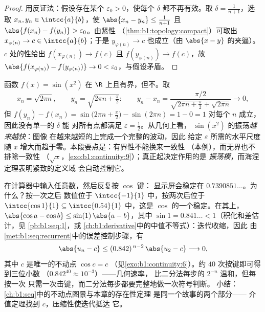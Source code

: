 \begin{proof}
用反证法：假设存在某个 $\varepsilon_0 > 0$，使每个
$\delta$ 都不再有效。取 $\delta = \frac{1}{n+1}$，选取 $x_n, y_n \in
\intcc{a}{b}$，使 $\abs{x_n - y_n} \leq \frac{1}{n+1}$ 且
$\abs{f(x_n) - f(y_n)} > \varepsilon_0$。由紧性
（\cref{thm:b1:topology:compact}）可取出 $x_{\varphi(n)} \to c \in
\intcc{a}{b}$；于是 $y_{\varphi(n)} \to c$ 也成立（由 $\abs{x -
y}$ 的夹逼）。$c$ 处的性给出 $f(x_{\varphi(n)}) \to f(c)$ 且
$f(y_{\varphi(n)}) \to f(c)$，故 $\abs{f(x_{\varphi(n)}) -
f(y_{\varphi(n)})} \to 0 < \varepsilon_0$，与假设矛盾。
\end{proof}

\begin{example}\label{ex:b1:continuity:sinx2}
函数 $f(x) = \sin(x^2)$ 在
$\R$ 上且有界，但不。取
\[
x_n = \sqrt{2\pi n}, \qquad y_n = \sqrt{2\pi n + \tfrac\pi2}:
\qquad
y_n - x_n = \frac{\pi/2}{\sqrt{2\pi n + \frac\pi2} +
\sqrt{2\pi n}} \longrightarrow 0 ,
\]
但 $f(y_n) - f(x_n) = \sin\bigl(2\pi n + \frac\pi2\bigr) -
\sin(2\pi n) = 1 - 0 = 1$ 对每个 $n$ 成立，因此没有单一的 $\delta$ 能
对所有点都满足 $\varepsilon = \frac12$。从几何上看，
$\sin(x^2)$ 的振荡\emph{越来越快}：图像
在越来越短的上完成一个完整的波动，因此
给定 $\varepsilon$ 所需的水平尺度
随 $x$ 增大而趋于零。本段要点是：有界性不能换来一致性
（本例），而无界也不排除一致性
（$\sqrt x$，\cref{exo:b1:continuity:9}）；真正起决定作用的是
\emph{振荡模}，而海涅定理表明紧致的定义域
会自动控制它。
\end{example}

\begin{example}[计算器实验的解释]\label{ex:b1:continuity:cositeration}
在计算器中输入任意数，然后反复按 $\cos$ 键：
显示屏会稳定在 $0.7390851\dots$。为什么？按一次之后
数值位于 $\intcc{-1}{1}$ 中，按两次后位于 $\intcc{\cos 1}{1}
\subseteq \intcc{0.54}{1}$ 中，这是 $\cos$ 的一个稳定。在其上，
$\abs{\cos a - \cos b} \leq \sin(1)\,\abs{a - b}$，其中 $\sin 1 =
0.841\dots < 1$（积化和差估计，见
\cref{pb:b1:seq:1}，或
\cref{ch:b1:derivative}中的中值不等式）：迭代收缩，因此
由\cref{met:b1:seq:recurrent}中的误差控制步骤，有
\[
\abs{u_n - c} \leq (0.842)^{\,n-2}\,\abs{u_2 - c}
\longrightarrow 0 ,
\]
其中 $c$ 是唯一的不动点 $\cos c = c$
（见\cref{exo:b1:continuity:6}）。约 $40$ 次按键即可得到三位小数
（$0.842^{40} \approx 10^{-3}$）——几何速率，
比二分法每步的 $2^{-n}$ 温和，但每按一次
只需一次击键，而二分法每步都要完整地做一次符号判断。
小结：\cref{ch:b1:seq}中的不动点图景与本章的存在性定理
是同一个故事的两个部分——
介值定理找到 $c$，压缩性使迭代抵达
它。
\end{example}

